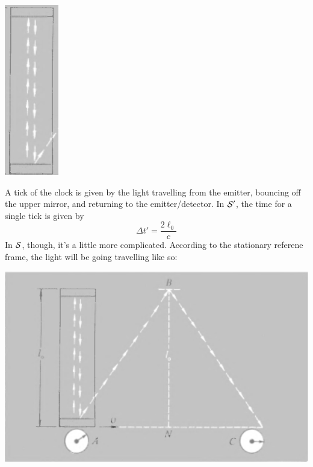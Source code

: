 \documentclass[a4paper]{article}
\begin{document}
\begin{center}
\includegraphics[scale=0.5]{LightClock}
\end{center}

A tick of the clock is given by the light travelling from the emitter,
bouncing off the upper mirror, and returning to the emitter/detector.
In $\S'$, the time for a single tick is given by
\[ \Delta t' = \frac{2\ell_0}{c} \]
In $\S$, though, it's a little more complicated. According to the stationary
referene frame, the light will be going travelling like so:
\begin{center}
\includegraphics[scale=0.5]{Light}
\end{center}
\end{document}
